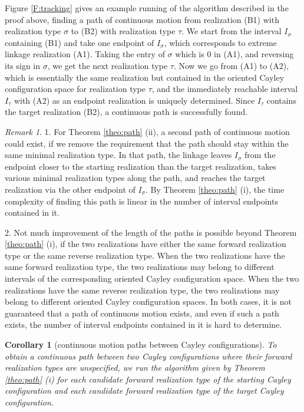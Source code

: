 \documentclass[secthm,amsthm,english]{article}
\newtheorem{corollary}{Corollary}
\theoremstyle{definition}
\theoremstyle{remark}
\newtheorem{remark}{Remark}
\begin{document}
Figure \ref{F:tracking} gives an example running 
of the algorithm described in the proof above, 
finding a path of continuous motion 
from realization (B1) with realization type $\sigma$ to (B2) with realization type $\tau$. 
We start from the interval $I_\sigma$ containing (B1) and take one endpoint of $I_\sigma$, which corresponds to extreme linkage realization (A1).  
Taking the entry of $\sigma$ which is 0 in (A1), and reversing its sign in $\sigma$, 
we get the next realization type $\tau$. 
Now we go from (A1) to (A2), 
which is essentially the same realization but contained in the oriented Cayley configuration space for realization type $\tau$, 
and the immediately reachable interval $I_\tau$ with (A2) as an endpoint realization is uniquely determined. 
Since $I_\tau$ contains the target realization (B2), a continuous path is successfully found. 


\begin{remark}
1. For Theorem \ref{theo:path} (ii), 
a second path of continuous motion could exist, 
if we remove the requirement that the path should stay within the same minimal realization type.  
In that path, the linkage leaves $I_\sigma$ from the endpoint 
closer to the starting realization than the target realization, 
takes various minimal realization types along the path, 
and reaches the target realization via the other endpoint of $I_\sigma$. 
By Theorem \ref{theo:path} (i), the time complexity of finding this path is  linear in the number of interval endpoints contained in it.

2. Not much improvement of the length of the paths is possible beyond  Theorem \ref{theo:path} (i), 
if the two realizations have either the same forward realization type or the same reverse realization type.  
When the two realizations have the same forward realization type, 
the  two realizations may belong to different intervals of the corresponding oriented Cayley configuration space. 
When the two realizations have the same reverse realization type, the two realizations may belong to different oriented Cayley configuration spaces. 
In both cases, it is not guaranteed that a path of continuous motion exists, 
and even if such a path exists, the number of interval endpoints contained in it is hard to determine. 
\end{remark}

\begin{corollary}[continuous motion paths between Cayley configurations]
\label{corollary:path_between_cayley}
To obtain a continuous path between two Cayley configurations where their forward realization types are unspecified, 
we run the algorithm given by Theorem \ref{theo:path} (i) for each candidate forward realization type of the starting Cayley configuration and each candidate forward realization type of the target Cayley configuration.
\end{corollary}
\end{document}
